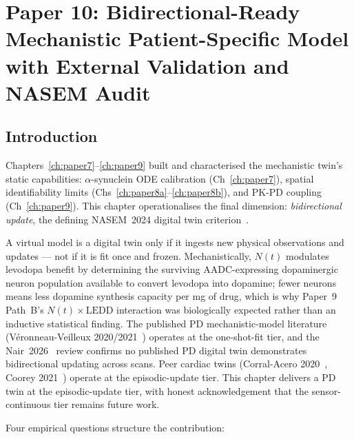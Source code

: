 
\chapter{Paper 10: Bidirectional-Ready Mechanistic Patient-Specific Model with External Validation and NASEM Audit}
\label{ch:paper10}

\section{Introduction}
\label{sec:p10-intro}

Chapters~\ref{ch:paper7}--\ref{ch:paper9} built and characterised the mechanistic twin's static capabilities: $\alpha$-synuclein ODE calibration (Ch~\ref{ch:paper7}), spatial identifiability limits (Chs~\ref{ch:paper8a}--\ref{ch:paper8b}), and PK-PD coupling (Ch~\ref{ch:paper9}). This chapter operationalises the final dimension: \emph{bidirectional update}, the defining NASEM~2024 digital twin criterion~\cite{NASEM2024DigitalTwins}.

A virtual model is a digital twin only if it ingests new physical observations and updates --- not if it is fit once and frozen. Mechanistically, $N(t)$ modulates levodopa benefit by determining the surviving AADC-expressing dopaminergic neuron population available to convert levodopa into dopamine; fewer neurons means less dopamine synthesis capacity per mg of drug, which is why Paper~9 Path~B's $N(t) \times \mathrm{LEDD}$ interaction was biologically expected rather than an inductive statistical finding. The published PD mechanistic-model literature (V\'eronneau-Veilleux 2020/2021~\cite{veronneau2020chaos,veronneau2020integrative}) operates at the one-shot-fit tier, and the Nair~2026~\cite{nair2026computationalpd} review confirms no published PD digital twin demonstrates bidirectional updating across scans. Peer cardiac twins (Corral-Acero 2020~\cite{corralacero2020cardiac}, Coorey 2021~\cite{coorey2021healthdt}) operate at the episodic-update tier. This chapter delivers a PD twin at the episodic-update tier, with honest acknowledgement that the sensor-continuous tier remains future work.

Four empirical questions structure the contribution:

